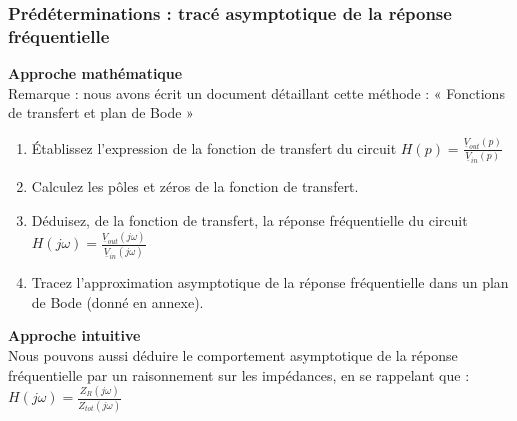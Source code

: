\documentclass{../template/labo}
\begin{document}
\subsubsection{Prédéterminations : tracé asymptotique de la réponse fréquentielle}\label{sec:predetA}
\begin{predet}
\textbf{Approche mathématique}\\
Remarque : nous avons écrit un document détaillant cette méthode : « Fonctions de transfert et plan de Bode »
\begin{enumerate}
\item Établissez l'expression de la fonction de transfert du circuit $H(p)=\frac{\underline{V}_{out}(p)}{\underline{V}_{in}(p)}$
\item Calculez les pôles et zéros de la fonction de transfert.
\item Déduisez, de la fonction de transfert, la réponse fréquentielle du circuit $H(j\omega)=\frac{\underline{V}_{out}(j\omega)}{\underline{V}_{in}(j\omega)}$
\item Tracez l'approximation asymptotique de la réponse fréquentielle dans un plan de Bode (donné en annexe).
\end{enumerate}

\textbf{Approche intuitive}\\
Nous pouvons aussi déduire le comportement asymptotique de la réponse fréquentielle par un raisonnement sur les impédances, en se rappelant que :
$H(j\omega)=\frac{Z_R(j\omega)}{Z_{tot}(j\omega)}$

{}

{}
	

\end{predet}
\end{document}
